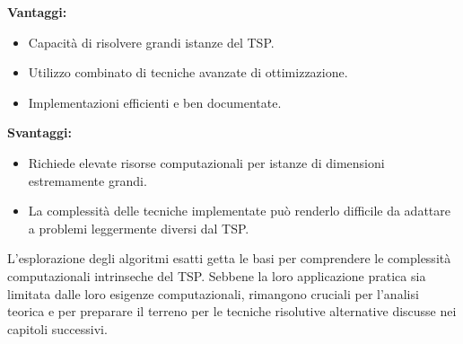 \textbf{Vantaggi:}
\begin{itemize}
    \item Capacità di risolvere grandi istanze del \gls{TSP}.
    \item Utilizzo combinato di tecniche avanzate di ottimizzazione.
    \item Implementazioni efficienti e ben documentate.
\end{itemize}

\textbf{Svantaggi:}
\begin{itemize}
    \item Richiede elevate risorse computazionali per istanze di dimensioni estremamente grandi.
    \item La complessità delle tecniche implementate può renderlo difficile da adattare a problemi leggermente diversi dal \gls{TSP}.
\end{itemize}


L'esplorazione degli algoritmi esatti getta le basi per comprendere le complessità computazionali intrinseche del \gls{TSP}. Sebbene la loro applicazione pratica sia limitata dalle loro esigenze computazionali, rimangono cruciali per l'analisi teorica e per preparare il terreno per le tecniche risolutive alternative discusse nei capitoli successivi.

